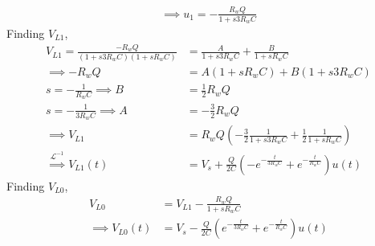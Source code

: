 \documentclass{article}
\begin{document}
\begin{subparts}
\begin{align}
        \implies u_1 = -\frac{R_w Q}{1 + s 3 R_w C}
    \end{align}
    Finding \(V_{L1}\),
    \begin{align}
        V_{L1} = \frac{-R_w Q}{(1 + s 3 R_w C) (1 + s R_w C)} &= \frac{A}{1 + s 3 R_w C} + \frac{B}{1 + s R_w C} \\
        \implies -R_w Q &= A (1 + s R_w C) + B (1 + s 3 R_w C) \\
        s = -\frac{1}{R_w C} \implies B &= \frac{1}{2} R_w Q \\
        s = -\frac{1}{3 R_w C} \implies A &= -\frac{3}{2} R_w Q \\
        \implies V_{L1} &= R_w Q \left(-\frac{3}{2} \frac{1}{1 + s 3 R_w C} + \frac{1}{2} \frac{1}{1 + s R_w C}\right) \\
        \overset{\mathcal{L}^{-1}}{\implies} V_{L1}(t) &= V_s + \frac{Q}{2C} (-e^{-\frac{t}{3 R_w C}} + e^{-\frac{t}{R_w C}}) u(t)
    \end{align}
    Finding \(V_{L0}\),
    \begin{align}
        V_{L0} &= V_{L1} - \frac{R_w Q}{1 + s R_w C} \\
        \implies V_{L0}(t) &= V_s - \frac{Q}{2C} (e^{-\frac{t}{3 R_w C}} + e^{-\frac{t}{R_w C}}) u(t)
    \end{align}
\end{subparts}
\end{document}
